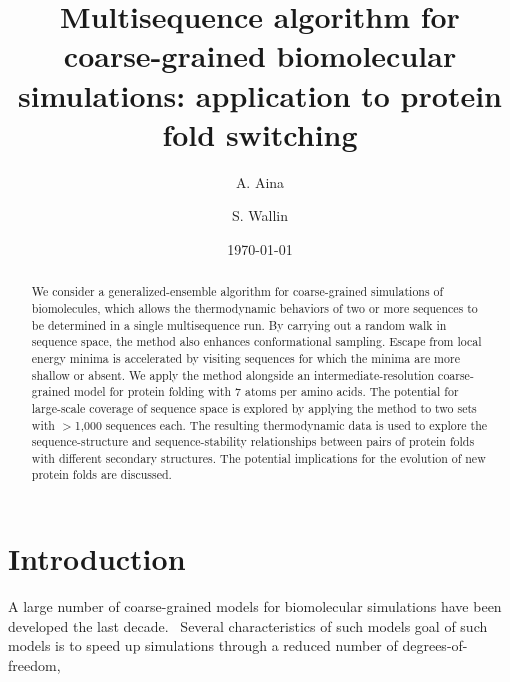 \documentclass[%
 aip,
rsi,%
 amsmath,amssymb,
 reprint,%
]{revtex4-1}
\begin{document}

\title[Multisequence Monte Carlo simulations]{Multisequence algorithm for coarse-grained biomolecular simulations: application to protein fold switching}

\author{A. Aina}
\author{S. Wallin}

\date{\today}

\begin{abstract}

We consider a generalized-ensemble algorithm for coarse-grained simulations of biomolecules, which allows the thermodynamic behaviors of two or more sequences to be determined in a single multisequence run. By carrying out a random walk in sequence space, the method also enhances conformational sampling. Escape from local energy minima is accelerated by visiting sequences for which the minima are more shallow or absent. We apply the method alongside an intermediate-resolution coarse-grained model for protein folding with 7 atoms per amino acids. The potential for large-scale coverage of sequence space is explored by applying the method to two sets with $>$1,000 sequences each. The resulting thermodynamic data is used to explore the sequence-structure and sequence-stability relationships between pairs of protein folds with different secondary structures. The potential implications for the evolution of new protein folds are discussed. 

 
\end{abstract}

                             


\maketitle

\section{Introduction}
\noindent
A large number of coarse-grained models for biomolecular simulations have been developed the last decade.~\cite{Ingolfsson2014} Several characteristics of such models goal of such models is to speed up simulations through a reduced number of degrees-of-freedom, 
\end{document}
